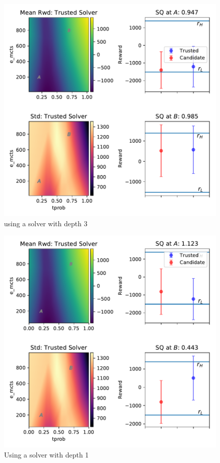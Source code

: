 \begin{figure}[htbp]
    \centering
    \includegraphics[width=0.9\linewidth]{Figures/transition_e_vary_e_mctstprob_ok.pdf}
    \caption{using a solver with depth 3}
    \label{fig:tprob}
\end{figure}
\begin{figure}[htbp]
    \centering
    \includegraphics[width=0.9\linewidth]{Figures/transition_e_vary_e_mctstprob_bad.pdf}
    \caption{Using a solver with depth 1}
    \label{fig:tprob}
\end{figure}
